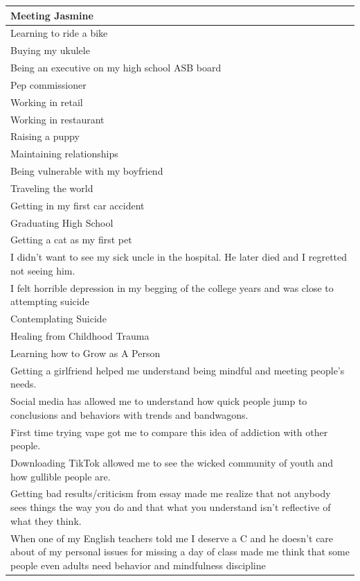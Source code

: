 \documentclass[
  .7em,
  letterpaper,
  DIV=11,
  numbers=noendperiod]{scrartcl}
\begin{document}
\begin{table}
\begin{tabular}{l}
\hline
Meeting Jasmine\\
\hline
Learning to ride a bike\\
\hline
Buying my ukulele\\
\hline
Being an executive on my high school ASB board\\
\hline
Pep commissioner\\
\hline
Working in retail\\
\hline
Working in restaurant\\
\hline
Raising a puppy\\
\hline
Maintaining relationships\\
\hline
Being vulnerable with my boyfriend\\
\hline
Traveling the world\\
\hline
Getting in my first car accident\\
\hline
Graduating High School\\
\hline
Getting a cat as my first pet\\
\hline
I didn't want to see my sick uncle in the hospital. He later died and I regretted not seeing him.\\
\hline
I felt horrible depression in my begging of the college years and was close to attempting suicide\\
\hline
Contemplating Suicide\\
\hline
Healing from Childhood Trauma\\
\hline
Learning how to Grow as A Person\\
\hline
Getting a girlfriend helped me understand being mindful and meeting people's needs.\\
\hline
Social media has allowed me to understand how quick people jump to conclusions and behaviors with trends and bandwagons.\\
\hline
First time trying vape got me to compare this idea of addiction with other people.\\
\hline
Downloading TikTok allowed me to see the wicked community of youth and how gullible people are.\\
\hline
Getting bad results/criticism from essay made me realize that not anybody sees things the way you do and that what you understand isn't reflective of what they think.\\
\hline
When one of my English teachers told me I deserve a C and he doesn't care about of my personal issues for missing a day of class made me think that some people even adults need behavior and mindfulness discipline\\

\end{tabular}
\end{table}
\end{document}
